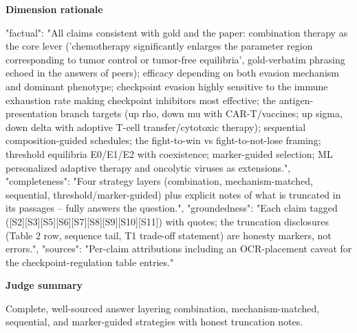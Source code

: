 \documentclass[10pt]{article}
\begin{document}
\textbf{Dimension rationale}
\begin{EvidenceText}
{
  "factual": "All claims consistent with gold and the paper: combination therapy as the core lever ('chemotherapy significantly enlarges the parameter region corresponding to tumor control or tumor-free equilibria', gold-verbatim phrasing echoed in the answers of peers); efficacy depending on both evasion mechanism and dominant phenotype; checkpoint evasion highly sensitive to the immune exhaustion rate making checkpoint inhibitors most effective; the antigen-presentation branch targets (up rho, down mu with CAR-T/vaccines; up sigma, down delta with adoptive T-cell transfer/cytotoxic therapy); sequential composition-guided schedules; the fight-to-win vs fight-to-not-lose framing; threshold equilibria E0/E1/E2 with coexistence; marker-guided selection; ML personalized adaptive therapy and oncolytic viruses as extensions.",
  "completeness": "Four strategy layers (combination, mechanism-matched, sequential, threshold/marker-guided) plus explicit notes of what is truncated in its passages -- fully answers the question.",
  "groundedness": "Each claim tagged ([S2][S3][S5][S6][S7][S8][S9][S10][S11]) with quotes; the truncation disclosures (Table 2 row, sequence tail, T1 trade-off statement) are honesty markers, not errors.",
  "sources": "Per-claim attributions including an OCR-placement caveat for the checkpoint-regulation table entries."
}
\end{EvidenceText}

\textbf{Judge summary}
\begin{EvidenceText}
Complete, well-sourced answer layering combination, mechanism-matched, sequential, and marker-guided strategies with honest truncation notes.
\end{EvidenceText}
\end{document}
